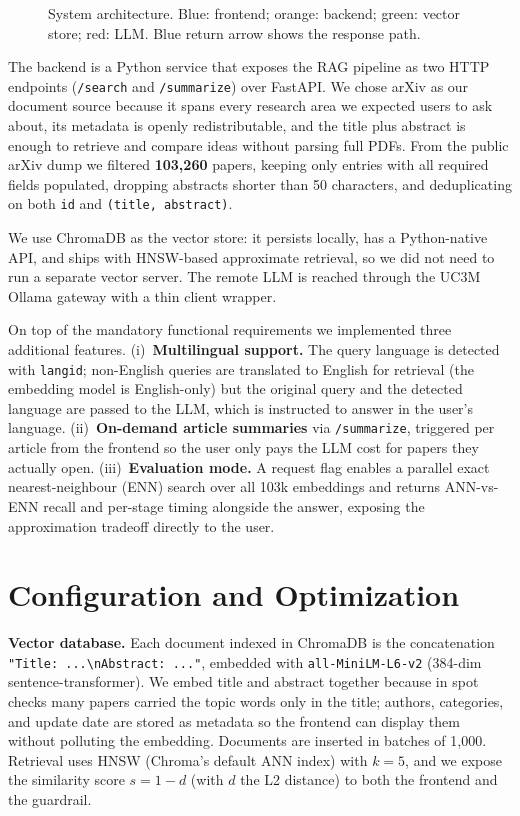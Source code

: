 \documentclass[conference]{IEEEtran}
\begin{document}
\begin{figure}[H]
\begin{tikzpicture}
\end{tikzpicture}
\caption{System architecture. \textcolor{blue!80}{Blue}: frontend; \textcolor{orange!80}{orange}: backend; \textcolor{green!60!black}{green}: vector store; \textcolor{red!70}{red}: LLM. Blue return arrow shows the response path.}
\label{fig:architecture}
\end{figure}

The backend is a Python service that exposes the RAG pipeline as two HTTP endpoints (\texttt{/search} and \texttt{/summarize}) over FastAPI. We chose arXiv as our document source because it spans every research area we expected users to ask about, its metadata is openly redistributable, and the title plus abstract is enough to retrieve and compare ideas without parsing full PDFs. From the public arXiv dump we filtered \textbf{103{,}260} papers, keeping only entries with all required fields populated, dropping abstracts shorter than 50 characters, and deduplicating on both \texttt{id} and \texttt{(title, abstract)}.

We use ChromaDB as the vector store: it persists locally, has a Python-native API, and ships with HNSW-based approximate retrieval, so we did not need to run a separate vector server. The remote LLM is reached through the UC3M Ollama gateway with a thin client wrapper.

On top of the mandatory functional requirements we implemented three additional features. (i)~\textbf{Multilingual support.} The query language is detected with \texttt{langid}; non-English queries are translated to English for retrieval (the embedding model is English-only) but the original query and the detected language are passed to the LLM, which is instructed to answer in the user's language. (ii)~\textbf{On-demand article summaries} via \texttt{/summarize}, triggered per article from the frontend so the user only pays the LLM cost for papers they actually open. (iii)~\textbf{Evaluation mode.} A request flag enables a parallel exact nearest-neighbour (ENN) search over all 103k embeddings and returns ANN-vs-ENN recall and per-stage timing alongside the answer, exposing the approximation tradeoff directly to the user.


\section{Configuration and Optimization}

\textbf{Vector database.} Each document indexed in ChromaDB is the concatenation \texttt{"Title: ...\textbackslash nAbstract: ..."}, embedded with \texttt{all-MiniLM-L6-v2} (384-dim sentence-transformer). We embed title and abstract together because in spot checks many papers carried the topic words only in the title; authors, categories, and update date are stored as metadata so the frontend can display them without polluting the embedding. Documents are inserted in batches of 1{,}000. Retrieval uses HNSW (Chroma's default ANN index) with $k=5$, and we expose the similarity score $s = 1 - d$ (with $d$ the L2 distance) to both the frontend and the guardrail.
\end{document}
